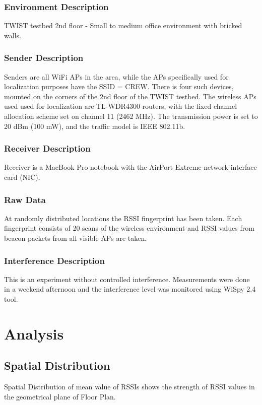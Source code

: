 \documentclass[11pt,a4paper,headinclude,footinclude,chapterprefix=on]{scrreprt}
\begin{document}
\subsection{Environment Description} TWIST testbed 2nd floor - Small to medium office environment with bricked walls.

\subsection{Sender Description} Senders are all WiFi APs in the area, while the APs specifically used for localization purposes have the SSID = CREW. There is four such devices, mounted on the corners of the 2nd floor of the TWIST testbed. The wireless APs used used for localization are TL-WDR4300 routers, with the fixed channel allocation scheme set on channel 11 (2462 MHz). The transmission power is set to 20 dBm (100 mW), and the traffic model is IEEE 802.11b.

\subsection{Receiver Description} Receiver is a MacBook Pro notebook with the AirPort Extreme network interface card (NIC).

\subsection{Raw Data} At randomly distributed locations the RSSI fingerprint has been taken. Each fingerprint consists of 20 scans of the wireless environment and RSSI values from beacon packets from all visible APs are taken.

\subsection{Interference Description} This is an experiment without controlled interference. Measurements were done in a weekend afternoon and the interference level was monitored using WiSpy 2.4 tool.

\chapter{Analysis} 
\section{Spatial Distribution} Spatial Distribution of mean value of RSSIs shows the strength of RSSI values in the geometrical plane of Floor Plan.
\end{document}
